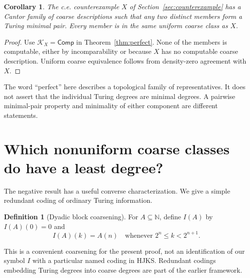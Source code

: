 \documentclass[11pt,a4paper]{article}
\newcommand{\N}{\mathbb N}
\newcommand{\Core}[1]{\mathcal K_{#1}}
\newcommand{\Comp}{\mathsf{Comp}}
\newtheorem{corollary}[theorem]{Corollary}
\theoremstyle{definition}\newtheorem{definition}[theorem]{Definition}
\theoremstyle{remark}\newtheorem{remark}[theorem]{Remark}
\begin{document}
\begin{corollary}\label{cor:perfect-minimal}
The c.e. counterexample $X$ of Section~\ref{sec:counterexample} has a Cantor family of coarse descriptions such that any two distinct members form a Turing minimal pair. Every member is in the same uniform coarse class as $X$.
\end{corollary}
\begin{proof}
Use $\Core X=\Comp$ in Theorem~\ref{thm:perfect}. None of the members is computable, either by incomparability or because $X$ has no computable coarse description. Uniform coarse equivalence follows from density-zero agreement with $X$.
\end{proof}

The word ``perfect'' here describes a topological family of representatives. It does not assert that the individual Turing degrees are minimal degrees. A pairwise minimal-pair property and minimality of either component are different statements.

\section{Which nonuniform coarse classes do have a least degree?}
\label{sec:classification}
The negative result has a useful converse characterization. We give a simple redundant coding of ordinary Turing information.

\begin{definition}[Dyadic block coarsening]
For $A\subseteq\N$, define $I(A)$ by $I(A)(0)=0$ and
\begin{equation}\label{eq:coarsening}
 I(A)(k)=A(n)\quad\text{whenever }2^n\le k<2^{n+1}.
\end{equation}
\end{definition}
This is a convenient coarsening for the present proof, not an identification of our symbol $I$ with a particular named coding in HJKS. Redundant codings embedding Turing degrees into coarse degrees are part of the earlier framework.\cite[Section 2]{HJKS}
\end{document}
